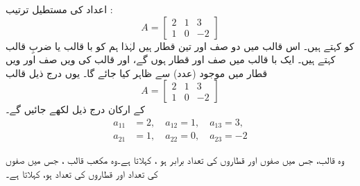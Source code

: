 اعداد کی مستطیل  ترتیب :
\[
A=\left[
\begin{array}{rrr}
2&1&3\\
1&0&-2
\end{array}
\right]
\]
کو  کہتے ہیں۔ اس قالب میں  دو  صف اور  تین  قطار ہیں لہٰذا   ہم  کو   با   قالب یا      ضربِ    قالب  کہتے ہیں۔ ایک     با  قالب     میں  صف اور   قطار  ہوں گے، اور  قالب کی   ویں صف اور  ویں قطار میں موجود  (عدد)  سے ظاہر کیا جائے گا۔ یوں درج ذیل قالب
\[
A=
\left[
\begin{array}{rrr}
2&1&3\\
1&0&-2
\end{array}
\right]
\]
کے ارکان   درج ذیل  لکھے جائیں گے۔
\begin{align*}
a_{11}&=2,\quad a_{12}=1,\quad a_{13}=3,\\
a_{21}&=1,\quad a_{22}=0,\quad a_{23}=-2
\end{align*}

وہ  قالب،   جس میں صفوں  اور قطاروں کی تعداد برابر ہو  ،  کہلاتا ہے۔وہ مکعب قالب  ، جس میں  صفوں کی تعداد اور قطاروں کی تعداد  ہو،  کہلاتا ہے۔


